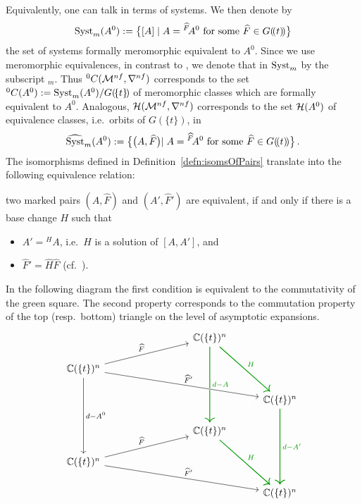Equivalently, one can talk in terms of systems. We then denote by
\[
  \operatorname{Syst}_m(A^0):=\bigl\{[A]
    \mid A={}^{\widehat F}\!A^0 \text{ for some } \widehat F\in G(\!(t)\!)\bigr\}
\]
the set of systems formally meromorphic equivalent to $A^0$.
Since we use meromorphic equivalences, in contrast to \cite{boalch,thboalch},
we denote that in $\operatorname{Syst}_m$ by the subscript ${}_m$.
Thus ${}^0C(\mathcal{M}^{nf},\nabla^{nf})$ corresponds to
the set ${}^0C(A^0):=\operatorname{Syst}_m(A^0)/G(\!\{t\}\!)$ of meromorphic classes which
are formally equivalent to $A^0$.
Analogous, $\mathcal{H}(\mathcal{M}^{nf},\nabla^{nf})$ corresponds to the set $\mathcal{H}(A^0)$ of
equivalence classes, i.e.\ orbits of $G(\!\{t\}\!)$, in
\[
  \widehat{\operatorname{Syst}}_m(A^0):=\bigl\{\bigl(A,\widehat F\bigl)
    \mid A={}^{\widehat F}\!A^0 \text{ for some } \widehat F\in G(\!(t)\!)\bigl\} \,.
\]
\label{page:ofDefnOfIsomOfMarkedPairs}
The isomorphisms defined in Definition~\ref{defn:isomsOfPairs} translate into
the following equivalence relation:
\begin{einr}
  two marked pairs $(A,\hat F)$ and $(A',\hat F')$ are equivalent, if and only
  if there is a base change $H$ such that
  \begin{itemize}
  \item $A'={}^{H}\!A$, i.e.\ $H$ is a solution of $[A,A']$, and
  \item $\hat F'=\hat H\hat F$ (cf.\ \cite[71]{babbitt1989local}).
  \end{itemize}
\end{einr}
In the following diagram the first condition is equivalent to the commutativity
of the \textcolor{green!60!black}{green} square. The second property corresponds
to the commutation property of the top (resp.\ bottom) triangle on the level of
asymptotic expansions\PROBLEM[?].
\[ \begin{tikzcd}[column sep=1cm,row sep=.5cm]
  &&&\C(\{t\})^n \arrow[green!60!black, thick]{ddd}{d-A}
    \arrow[green!60!black, thick]{ddr}{H}
\\\C(\{t\})^n \arrow{rrru}{\hat F}
  \arrow[ultra thick, white]{rrrrd}{\hat F'}
  \arrow{rrrrd}{\hat F'}
  \arrow{ddd}{d-A^0}
\\&&&&\C(\{t\})^n \arrow[green!60!black, thick]{ddd}{d-A'}
\\&&&\C(\{t\})^n \arrow[green!60!black, thick]{ddr}{H}
\\\C(\{t\})^n \arrow{rrru}{\hat F} \arrow{rrrrd}{\hat F'}
\\&&&&\C(\{t\})^n
\end{tikzcd} \]

